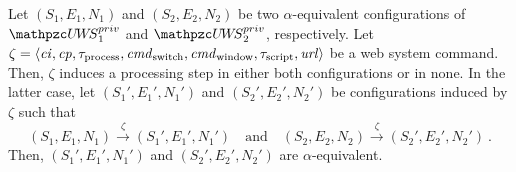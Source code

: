   \begin{lemma}\label{lemma:rp:step-config-private}
    Let $(S_1,E_1,N_1)$ and $(S_2,E_2,N_2)$ be two 
    $\alpha$-equivalent configurations of 
    $\uppressoprivwebsystem_1$ and $\uppressoprivwebsystem_2$, 
    respectively. Let $\zeta = \langle\mathit{ci},\mathit{cp}, 
    \tau_\text{process}, \mathit{cmd}_\text{switch}, 
    \mathit{cmd}_\text{window},\tau_\text{script},\mathit{url}\rangle$
    be a web system command. Then, $\zeta$ induces a processing 
    step in either both configurations or in none. In the latter 
    case, let $(S_1',E_1',N_1')$ and $(S_2',E_2',N_2')$ be 
    configurations induced by $\zeta$ such that
    \[(S_1,E_1,N_1) \xrightarrow{\zeta} (S_1',E_1',N_1') \quad 
    \text{and} \quad (S_2,E_2,N_2) \xrightarrow{\zeta} 
    (S_2',E_2',N_2') \ .\]
    Then, $(S_1',E_1',N_1')$ and $(S_2',E_2',N_2')$ are
    $\alpha$-equivalent.  
  \end{lemma}
